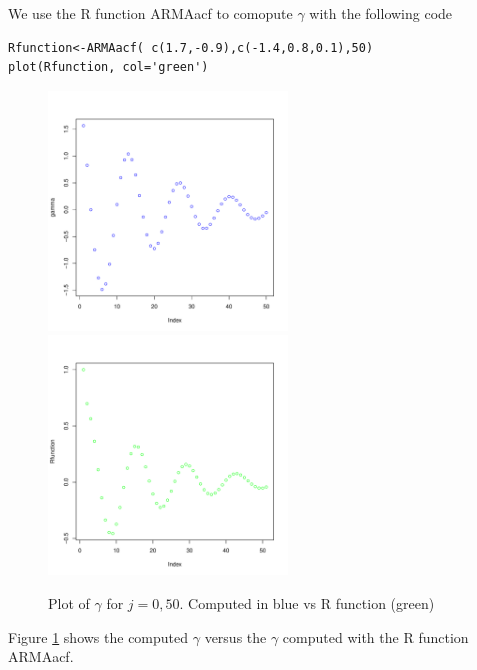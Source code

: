 \documentclass[11pt, oneside]{article}   	%
\begin{document}
We use the R function ARMAacf to comopute $\gamma$ with the following code
\begin{lstlisting}
Rfunction<-ARMAacf( c(1.7,-0.9),c(-1.4,0.8,0.1),50)
plot(Rfunction, col='green')
\end{lstlisting}


\begin{figure}[H] %
   \centering
   \includegraphics[width=2.5in]{gamma} 
    \includegraphics[width=2.5in]{Rfunction} 
   \caption{Plot of $\gamma$ for $j = 0, 50$. Computed in blue vs R function (green)}
   \label{fig:gamma}
\end{figure}
Figure \ref{fig:gamma} shows the computed $\gamma$ versus the $\gamma$ computed with the R function ARMAacf.


\end{document}
